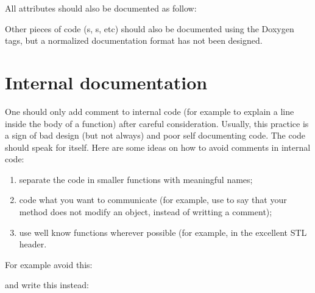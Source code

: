 All attributes should also be documented as follow:

Other pieces of code (s, s, etc) should also be 
documented using the Doxygen tags, but a normalized documentation format 
has not been designed.

\section{Internal documentation}
One should only add comment to internal code (for example to explain a line 
inside the body of a function) after careful consideration. Usually, this 
practice is a sign of bad design (but not always) and poor self documenting 
code. The code should speak for itself. Here are some ideas on how to avoid 
comments in internal code:

\begin{enumerate}

 \item separate the code in smaller functions with meaningful names;
 
 \item code what you want to communicate (for example, use  to say 
       that your method does not modify an object, instead of writting a 
       comment);
       
 \item use well know functions wherever possible (for example, in the excellent 
        STL header.
       
\end{enumerate}

For example avoid this:

\newpage

and write this instead:
